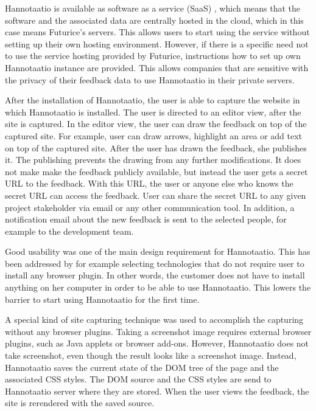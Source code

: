 \documentclass[english,12pt,a4paper,pdftex]{article}
\begin{document}
Hannotaatio is available as software as a service (SaaS) \citep{saas}, which means that the software and the associated data are centrally hosted in the cloud, which in this case means Futurice's servers. This allows users to start using the service without setting up their own hosting environment. However, if there is a specific need not to use the service hosting provided by Futurice, instructions how to set up own Hannotaatio instance are provided. This allows companies that are sensitive with the privacy of their feedback data to use Hannotaatio in their private servers.

After the installation of Hannotaatio, the user is able to capture the website in which Hannotaatio is installed. The user is directed to an editor view, after the site is captured. In the editor view, the user can draw the feedback on top of the captured site. For example, user can draw arrows, highlight an area or add text on top of the captured site. After the user has drawn the feedback, she publishes it. The publishing prevents the drawing from any further modifications. It does not make make the feedback publicly available, but instead the user gets a secret \ac{URL} to the feedback. With this \ac{URL}, the user or anyone else who knows the secret \ac{URL} can access the feedback. User can share the secret \ac{URL} to any given project stakeholder via email or any other communication tool. In addition, a notification email about the new feedback is sent to the selected people, for example to the development team.

Good usability was one of the main design requirement for Hannotaatio. This has been addressed by for example selecting technologies that do not require user to install any browser plugin. In other words, the customer does not have to install anything on her computer in order to be able to use Hannotaatio. This lowers the barrier to start using Hannotaatio for the first time.

A special kind of site capturing technique was used to accomplish the capturing without any browser plugins. Taking a screenshot image requires external browser plugins, such as Java applets or browser add-ons. However, Hannotaatio does not take screenshot, even though the result looks like a screenshot image. Instead, Hannotaatio saves the current state of the \ac{DOM} tree of the page and the associated \ac{CSS} styles. The \ac{DOM} source and the \ac{CSS} styles are send to Hannotaatio server where they are stored. When the user views the feedback, the site is rerendered with the saved source.
\end{document}
